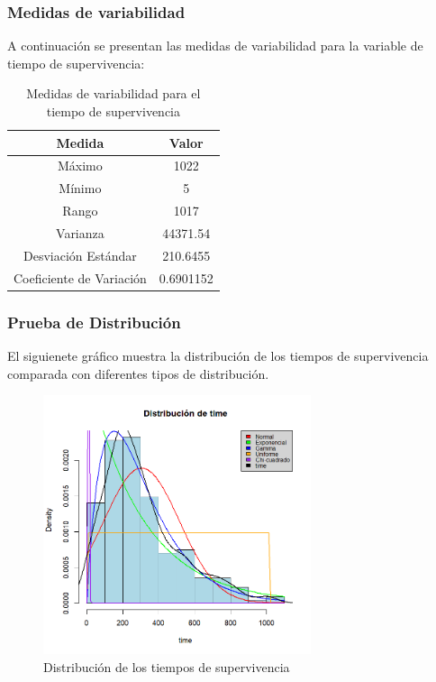 \documentclass[a4paper,12pt]{article}
\begin{document}
\clearpage

\subsubsection*{Medidas de variabilidad}

A continuación se presentan las medidas de variabilidad para la variable de tiempo de supervivencia:

\begin{table}[h!]
    \centering
    \begin{tabular}{|c|c|}
        \hline
        \textbf{Medida} & \textbf{Valor} \\
        \hline
        Máximo & 1022 \\
        \hline
        Mínimo & 5 \\
        \hline
        Rango & 1017 \\
        \hline
        Varianza & 44371.54 \\
        \hline
        Desviación Estándar & 210.6455 \\
        \hline
        Coeficiente de Variación & 0.6901152 \\
        \hline
    \end{tabular}
    \caption{Medidas de variabilidad para el tiempo de supervivencia}
    \label{tab:medidas_variabilidad}
\end{table}

\subsubsection*{Prueba de Distribución}

El siguienete gráfico muestra la distribución de los tiempos de supervivencia comparada con diferentes tipos de distribución.

\begin{figure}[h]
 	\centering
 	\includegraphics[width=0.7\textwidth]{distribucion_time.png}
 	\caption{Distribución de los tiempos de supervivencia}
 	\label{fig:time_distribution}
\end{figure}
\end{document}
